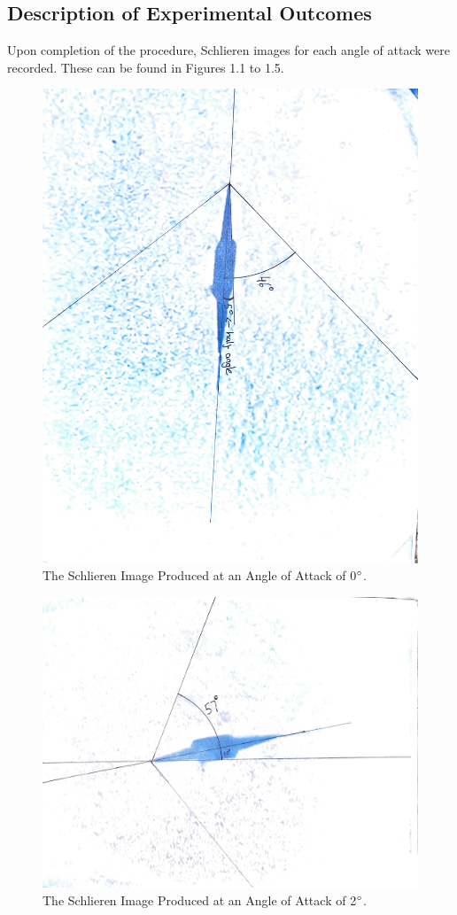 \documentclass[stu, a4paper, 12pt, floatsintext]{apa7}
\numberwithin{figure}{section}
\numberwithin{table}{section}
\numberwithin{equation}{section}
\begin{document}
\subsection{Description of Experimental Outcomes}
Upon completion of the procedure, Schlieren images for each angle of attack were recorded. These can be found in Figures 1.1 to 1.5.
\begin{figure}[H]
    \caption{The Schlieren Image Produced at an Angle of Attack of 0$\degree$.}
    \label{fig:aero_zero}
    \centering
    \includegraphics[width=1.0\textwidth]{pictures/zero.png}
\end{figure}
\begin{figure}[H]
    \caption{The Schlieren Image Produced at an Angle of Attack of 2$\degree$.}
    \label{fig:aero_two}
    \centering
    \includegraphics[width=1.0\textwidth]{pictures/two.png}
\end{figure}
\end{document}
